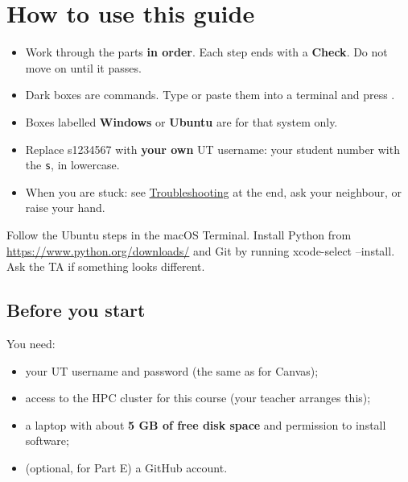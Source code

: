 \documentclass[11pt,a4paper]{article}
\newcommand{\key}[1]{\tcbox[on line, colback=tint, colframe=slate!60, boxrule=0.4pt, arc=0.8mm,
  left=0.8mm, right=0.8mm, top=0.2mm, bottom=0.2mm]{\small\ttfamily #1}}
\newcommand{\code}[1]{\colorbox{tint}{\ttfamily\small #1}}
\begin{document}
\newpage

\section*{How to use this guide}

\begin{itemize}
  \item Work through the parts \textbf{in order}. Each step ends with a \textbf{Check}. Do not move on until it passes.
  \item Dark boxes are commands. Type or paste them into a terminal and press \key{Enter}.
  \item Boxes labelled \textbf{\color{winblue}Windows} or \textbf{\color{ubuorange}Ubuntu} are for that system only.
  \item Replace \code{s1234567} with \textbf{your own} UT username: your student number with the \texttt{s}, in lowercase.
  \item When you are stuck: see \hyperref[sec:trouble]{Troubleshooting} at the end, ask your neighbour, or raise your hand.
\end{itemize}

\begin{notebox}
Follow the Ubuntu steps in the macOS Terminal. Install Python from \url{https://www.python.org/downloads/} and Git by running \code{xcode-select --install}. Ask the TA if something looks different.
\end{notebox}

\subsection*{Before you start}
You need:
\begin{itemize}
  \item your UT username and password (the same as for Canvas);
  \item access to the HPC cluster for this course (your teacher arranges this);
  \item a laptop with about \textbf{5 GB of free disk space} and permission to install software;
  \item (optional, for Part E) a GitHub account.
\end{itemize}
\end{document}
